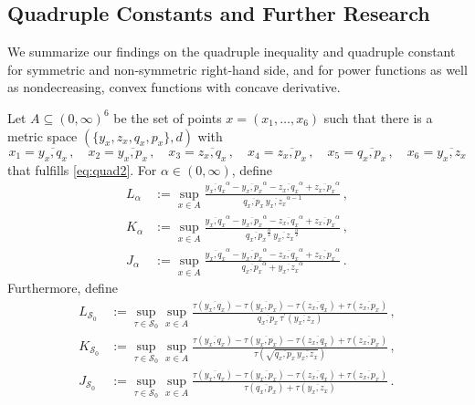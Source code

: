 \documentclass{article}
\renewcommand{\subset}{\subseteq}
\newcommand*{\mc}[1]{\mathcal{#1}}
\newcommand{\Rpp}{(0, \infty)} %
\newcommand{\pr}{^\prime}
\newcommand{\equationFullstop}{\, .}
\newcommand{\eqfs}{\equationFullstop}
\newcommand{\equationComma}{\, ,}
\newcommand{\eqcm}{\equationComma}
\newcommand{\ol}[2]{\overline{#1,#2}}
\newcommand{\tran}{\tau}
\newcommand{\dtran}{\tran\pr}
\newcommand{\setcco}{\mc S_0}
\begin{document}
\subsection{Quadruple Constants and Further Research}
% 
We summarize our findings on the quadruple inequality and quadruple constant for symmetric and non-symmetric right-hand side, and for power functions as well as nondecreasing, convex functions with concave derivative.

Let $A \subset \Rpp^6$ be the set of points $x = (x_1, \dots, x_6)$ such that there is a metric space $(\{y_x,z_x,q_x,p_x\}, d)$ with
\begin{equation}
	x_1 = \ol {y_x}{q_x}
	\eqcm\quad
	x_2 = \ol {y_x}{p_x}
	\eqcm\quad
	x_3 = \ol {z_x}{q_x}
	\eqcm\quad
	x_4 = \ol {z_x}{p_x}
	\eqcm\quad
	x_5 = \ol {q_x}{p_x}
	\eqcm\quad
	x_6 = \ol {y_x}{z_x}
\end{equation} 
that fulfills \eqref{eq:quad2}.
For $\alpha\in\Rpp$, define
\begin{align*}
	L_\alpha &:= \sup_{x\in A}  \frac{\ol {y_x}{q_x}^\alpha - \ol {y_x}{p_x}^\alpha - \ol {z_x}{q_x}^\alpha + \ol {z_x}{p_x}^\alpha}{\ol {q_x}{p_x} \,\ol {y_x}{z_x}^{\alpha-1}}\eqcm\\
	K_\alpha &:= \sup_{x\in A}  \frac{\ol {y_x}{q_x}^\alpha - \ol {y_x}{p_x}^\alpha - \ol {z_x}{q_x}^\alpha + \ol {z_x}{p_x}^\alpha}{\ol {q_x}{p_x}^{\frac\alpha2} \,\ol {y_x}{z_x}^{\frac\alpha2}}\eqcm\\
	J_\alpha &:= \sup_{x\in A}  \frac{\ol {y_x}{q_x}^\alpha - \ol {y_x}{p_x}^\alpha - \ol {z_x}{q_x}^\alpha + \ol {z_x}{p_x}^\alpha}{\ol {q_x}{p_x}^\alpha + \ol {y_x}{z_x}^\alpha}\eqfs
\end{align*}
Furthermore, define
\begin{align*}
	L_{\setcco} &:= \sup_{\tran\in\setcco} \sup_{x\in A} \frac{\tran(\ol {y_x}{q_x}) - \tran(\ol {y_x}{p_x}) - \tran(\ol {z_x}{q_x}) + \tran(\ol {z_x}{p_x})}{\ol {q_x}{p_x} \,\dtran(\ol {y_x}{z_x})}\eqcm\\
	K_{\setcco} &:= \sup_{\tran\in\setcco} \sup_{x\in A} \frac{\tran(\ol {y_x}{q_x}) - \tran(\ol {y_x}{p_x}) - \tran(\ol {z_x}{q_x}) + \tran(\ol {z_x}{p_x})}{\tran(\sqrt{\ol {q_x}{p_x}\,\ol {y_x}{z_x}})}\eqcm\\
	J_{\setcco} &:= \sup_{\tran\in\setcco} \sup_{x\in A} \frac{\tran(\ol {y_x}{q_x}) - \tran(\ol {y_x}{p_x}) - \tran(\ol {z_x}{q_x}) + \tran(\ol {z_x}{p_x})}{\tran(\ol {q_x}{p_x}) + \tran(\ol {y_x}{z_x})}\eqfs
\end{align*}
%
\end{document}
